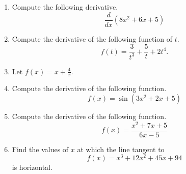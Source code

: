 \documentclass{article}
\begin{document}
\ActivityTitle[class=Calculus I, number=3, name=Differentiation I]

\begin{enumerate}
\item Compute the following derivative. \[ \frac{d}{dx} \left( 8 x^2 + 6 x + 5 \right) \]



  
\vspace{5cm}

\item Compute the derivative of the following function of $t$. \[ f(t) = \frac{3}{t^{3}} + \frac{5}{t} + 2 t^{4}. \]

  
\vspace{5cm}

\item Let $f(x) = x + \frac{4}{x}$.

  
\vspace{5cm}

\item Compute the derivative of the following function. \[ f(x) = \sin(3 x^2 + 2 x + 5) \]

  
\vspace{5cm}

\item Compute the derivative of the following function. \[ f(x) = \frac{x^2 + 7 x + 5}{6 x - 5} \]

  
\vspace{5cm}

\item Find the values of $x$ at which the line tangent to \[ f(x) = x^3 + 12 x^2 + 45 x + 94 \] is horizontal.

  
\vspace{5cm}
\end{enumerate}
\end{document}
